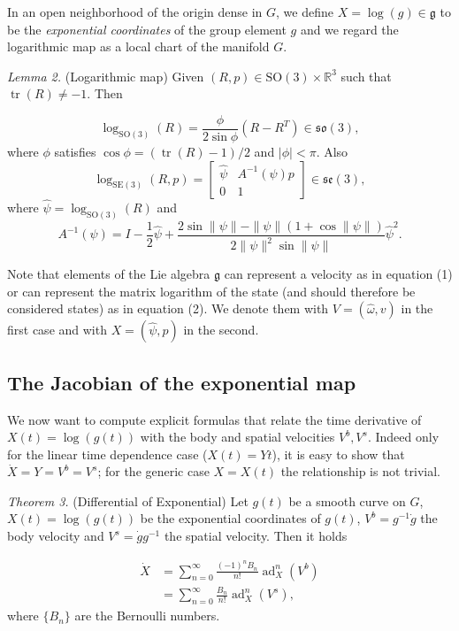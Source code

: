 \documentclass[10pt,twocolumn]{article}
\newcommand{\SO}{\mathrm{SO}}
\newcommand{\SE}{\mathrm{SE}}
\newcommand{\so}{\mathfrak{so}}
\newcommand{\se}{\mathfrak{se}}
\newcommand{\gfrak}{\mathfrak g}
\newcommand{\ad}{\operatorname{ad}}
\newcommand{\tr}{\operatorname{tr}}
\newcommand{\R}{\mathbb R}
\newcommand{\paperhead}[2]{\par\medskip\noindent\textit{#1} #2\par}
\begin{document}
In an open neighborhood of the origin dense in $G$, we define $X=\log(g)\in\gfrak$ to be the \emph{exponential coordinates} of the group element $g$ and we regard the logarithmic map as a local chart of the manifold $G$.

\paperhead{Lemma 2.}{(Logarithmic map) Given $(R,p)\in\SO(3)\times\R^3$ such that $\tr(R)\neq-1$. Then}
\begin{equation*}
\log_{\SO(3)}(R)=\frac{\phi}{2\sin\phi}(R-R^T)\in\so(3),
\end{equation*}
where $\phi$ satisfies $\cos\phi=(\tr(R)-1)/2$ and $|\phi|<\pi$. Also
\begin{equation*}
\log_{\SE(3)}(R,p)=
\begin{bmatrix}
\widehat\psi&A^{-1}(\psi)p\\
0&1
\end{bmatrix}\in\se(3),
\end{equation*}
where $\widehat\psi=\log_{\SO(3)}(R)$ and
\begin{equation*}
A^{-1}(\psi)=I-\frac12\widehat\psi
+\frac{2\sin\|\psi\|-\|\psi\|(1+\cos\|\psi\|)}{2\|\psi\|^2\sin\|\psi\|}\widehat\psi^2.
\end{equation*}

Note that elements of the Lie algebra $\gfrak$ can represent a velocity as in equation (1) or can represent the matrix logarithm of the state (and should therefore be considered states) as in equation (2). We denote them with $V=(\widehat\omega,v)$ in the first case and with $X=(\widehat\psi,p)$ in the second.

\subsection{The Jacobian of the exponential map}
We now want to compute explicit formulas that relate the time derivative of $X(t)=\log(g(t))$ with the body and spatial velocities $V^b,V^s$. Indeed only for the linear time dependence case ($X(t)=Yt$), it is easy to show that $\dot X=Y=V^b=V^s$; for the generic case $X=X(t)$ the relationship is not trivial.

\paperhead{Theorem 3.}{(Differential of Exponential) Let $g(t)$ be a smooth curve on $G$, $X(t)=\log(g(t))$ be the exponential coordinates of $g(t)$, $V^b=g^{-1}\dot g$ the body velocity and $V^s=\dot g g^{-1}$ the spatial velocity. Then it holds}
\begin{align*}
\dot X&=\sum_{n=0}^{\infty}\frac{(-1)^nB_n}{n!}\ad_X^n(V^b)\\
&=\sum_{n=0}^{\infty}\frac{B_n}{n!}\ad_X^n(V^s),
\end{align*}
where $\{B_n\}$ are the Bernoulli numbers.
\end{document}
